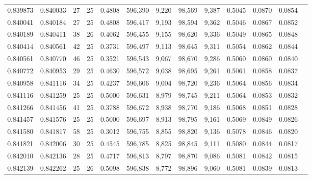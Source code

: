 \begin{tabular}{rrrrrrrrrrrrr}
0.839873 & 0.840033 &    27 &  25 &                                     0.4808 & 596,390 &   9,220 &  98,569 &   9,387 & 0.5045 & 0.0870 & 0.0854 \\
0.840041 & 0.840184 &    27 &  25 &                                     0.4808 & 596,417 &   9,193 &  98,594 &   9,362 & 0.5046 & 0.0867 & 0.0852 \\
0.840189 & 0.840411 &    38 &  26 &                                     0.4062 & 596,455 &   9,155 &  98,620 &   9,336 & 0.5049 & 0.0865 & 0.0848 \\
0.840414 & 0.840561 &    42 &  25 &                                     0.3731 & 596,497 &   9,113 &  98,645 &   9,311 & 0.5054 & 0.0862 & 0.0844 \\
0.840561 & 0.840770 &    46 &  25 &                                     0.3521 & 596,543 &   9,067 &  98,670 &   9,286 & 0.5060 & 0.0860 & 0.0840 \\
0.840772 & 0.840953 &    29 &  25 &                                     0.4630 & 596,572 &   9,038 &  98,695 &   9,261 & 0.5061 & 0.0858 & 0.0837 \\
0.840958 & 0.841116 &    34 &  25 &                                     0.4237 & 596,606 &   9,004 &  98,720 &   9,236 & 0.5064 & 0.0856 & 0.0834 \\
0.841116 & 0.841259 &    25 &  25 &                                     0.5000 & 596,631 &   8,979 &  98,745 &   9,211 & 0.5064 & 0.0853 & 0.0832 \\
0.841266 & 0.841456 &    41 &  25 &                                     0.3788 & 596,672 &   8,938 &  98,770 &   9,186 & 0.5068 & 0.0851 & 0.0828 \\
0.841457 & 0.841576 &    25 &  25 &                                     0.5000 & 596,697 &   8,913 &  98,795 &   9,161 & 0.5069 & 0.0849 & 0.0826 \\
0.841580 & 0.841817 &    58 &  25 &                                     0.3012 & 596,755 &   8,855 &  98,820 &   9,136 & 0.5078 & 0.0846 & 0.0820 \\
0.841821 & 0.842006 &    30 &  25 &                                     0.4545 & 596,785 &   8,825 &  98,845 &   9,111 & 0.5080 & 0.0844 & 0.0817 \\
0.842010 & 0.842136 &    28 &  25 &                                     0.4717 & 596,813 &   8,797 &  98,870 &   9,086 & 0.5081 & 0.0842 & 0.0815 \\
0.842139 & 0.842262 &    25 &  26 &                                     0.5098 & 596,838 &   8,772 &  98,896 &   9,060 & 0.5081 & 0.0839 & 0.0813 \\

\end{tabular}
